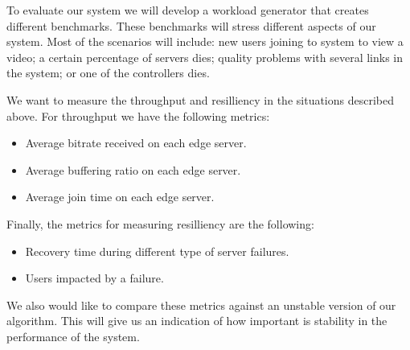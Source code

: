 To evaluate our system we will develop a workload generator that creates different benchmarks. These benchmarks will stress different aspects of our system. Most of the scenarios will include: new users joining to system to view a video; a certain percentage of servers dies; quality problems with several links in the system; or one of the controllers dies.

We want to measure the throughput and resilliency in the situations described above. For throughput we have the following metrics:

\begin{itemize}
\item Average bitrate received on each edge server.
\item Average buffering ratio on each edge server.
\item Average join time on each edge server.
\end{itemize}

Finally, the metrics for measuring resilliency are the following:

\begin{itemize}
\item Recovery time during different type of server failures.
\item Users impacted by a failure.
\end{itemize}

We also would like to compare these metrics against an unstable version of our algorithm. This will give us an indication of how important is stability in the performance of the system.
